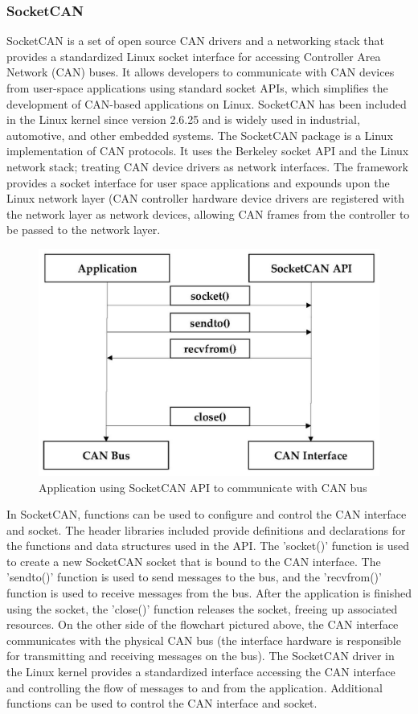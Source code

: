 \documentclass[12pt]{article}
\begin{document}
\subsubsection{SocketCAN}
SocketCAN is a set of open source CAN drivers and a networking stack that provides a standardized Linux socket interface for accessing Controller Area Network (CAN) buses. It allows developers to communicate with CAN devices from user-space applications using standard socket APIs, which simplifies the development of CAN-based applications on Linux. SocketCAN has been included in the Linux kernel since version 2.6.25 and is widely used in industrial, automotive, and other embedded systems. The SocketCAN package is a Linux implementation of CAN protocols. It uses the Berkeley socket API and the Linux network stack; treating CAN device drivers as network interfaces. The framework provides a socket interface for user space applications and expounds upon the Linux network layer (CAN controller hardware device drivers are registered with the network layer as network devices, allowing CAN frames from the controller to be passed to the network layer. 
 \begin{figure}[!h]
    \centering
    \includegraphics[width=\textwidth]{images/02-2023/SocketCAN.jpg}
    \caption{Application using SocketCAN API to communicate with CAN bus}
    \label{fig:can_specification}
\end{figure}
\pagebreak
In SocketCAN, functions can be used to configure and control the CAN interface and socket. The header libraries included provide definitions and declarations for the functions and data structures used in the API. The 'socket()' function is used to create a new SocketCAN socket that is bound to the CAN interface. The 'sendto()' function is used to send messages to the bus, and the 'recvfrom()' function is used to receive messages from the bus. After the application is finished using the socket, the 'close()' function releases the socket, freeing up associated resources. On the other side of the flowchart pictured above, the CAN interface communicates with the physical CAN bus (the interface hardware is responsible for transmitting and receiving messages on the bus). The SocketCAN driver in the Linux kernel provides a standardized interface accessing the CAN interface and controlling the flow of messages to and from the application.  Additional functions can be used to control the CAN interface and socket.
\end{document}

